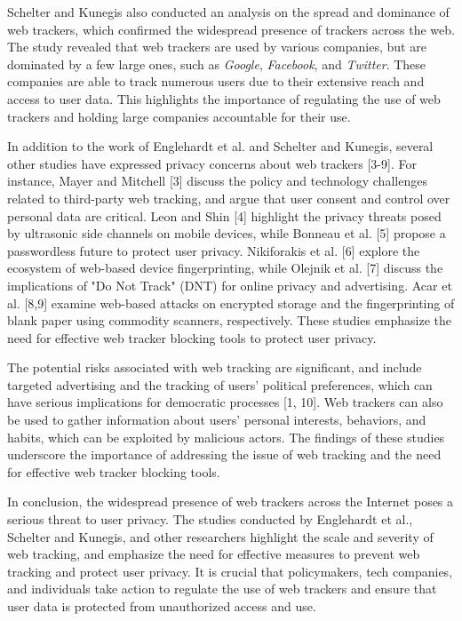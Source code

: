 Schelter and Kunegis \cite{schelter2018ubiquity} also conducted an analysis
on the spread and dominance of web trackers, which confirmed the widespread
presence of trackers across the web. The study revealed that web trackers
are used by various companies, but are dominated by a few large ones,
such as \textit{Google}, \textit{Facebook}, and \textit{Twitter}. These companies are able
to track numerous users due to their extensive reach and
access to user data. This highlights the importance of regulating 
the use of web trackers and holding large companies accountable for their use.


In addition to the work of Englehardt et al. and Schelter and Kunegis,
several other studies have expressed privacy concerns about web trackers [3-9].
For instance, Mayer and Mitchell [3] discuss the policy and technology 
challenges related to third-party web tracking, and argue that user consent
and control over personal data are critical. Leon and Shin [4] highlight the
privacy threats posed by ultrasonic side channels on mobile devices, while
Bonneau et al. [5] propose a passwordless future to protect user privacy.
Nikiforakis et al. [6] explore the ecosystem of web-based device fingerprinting,
while Olejnik et al. [7] discuss the implications of "Do Not Track" (DNT)
for online privacy and advertising. Acar et al. [8,9] examine web-based attacks
on encrypted storage and the fingerprinting of blank paper using commodity
scanners, respectively. These studies emphasize the need for effective
web tracker blocking tools to protect user privacy.

The potential risks associated with web tracking are significant,
and include targeted advertising and the tracking of users' political
preferences, which can have serious implications for democratic
processes [1, 10]. Web trackers can also be used to gather information
about users' personal interests, behaviors, and habits, which can be
exploited by malicious actors. The findings of these studies underscore
the importance of addressing the issue of web tracking and the need
for effective web tracker blocking tools.

In conclusion, the widespread presence of web trackers across the Internet
poses a serious threat to user privacy. The studies conducted
by Englehardt et al., Schelter and Kunegis, and other researchers
highlight the scale and severity of web tracking, and emphasize
the need for effective measures to prevent web tracking and
protect user privacy. It is crucial that policymakers, tech companies,
and individuals take action to regulate the use of web trackers
and ensure that user data is protected from unauthorized access and use.

